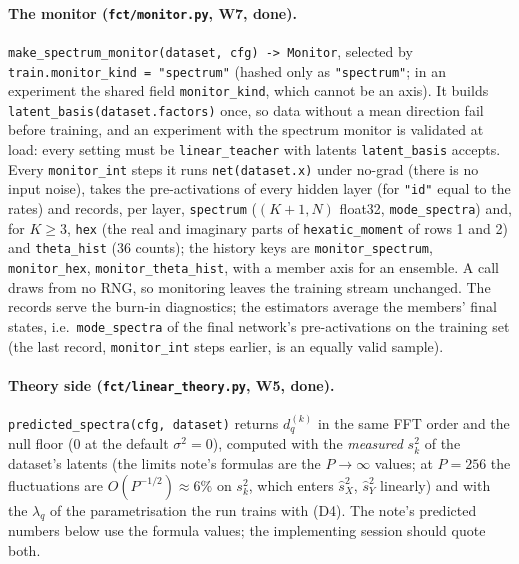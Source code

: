 \documentclass[11pt,a4paper]{article}
\newcommand{\sX}{\hat s_X^2}
\newcommand{\sY}{\hat s_Y^2}
\newcommand{\code}[1]{\texttt{#1}}
\begin{document}
\paragraph{The monitor (\code{fct/monitor.py}, W7, done).} \code{make\_spectrum\_monitor(dataset, cfg) -> Monitor}, selected by \code{train.monitor\_kind = "spectrum"} (hashed only as \code{"spectrum"}; in an experiment the shared field \code{monitor\_kind}, which cannot be an axis). It builds \code{latent\_basis(dataset.factors)} once, so data without a mean direction fail before training, and an experiment with the spectrum monitor is validated at load: every setting must be \code{linear\_teacher} with latents \code{latent\_basis} accepts. Every \code{monitor\_int} steps it runs \code{net(dataset.x)} under no-grad (there is no input noise), takes the pre-activations of every hidden layer (for \code{"id"} equal to the rates) and records, per layer, \code{spectrum} ($(K+1, N)$ float32, \code{mode\_spectra}) and, for $K\ge3$, \code{hex} (the real and imaginary parts of \code{hexatic\_moment} of rows 1 and 2) and \code{theta\_hist} (36 counts); the history keys are \code{monitor\_spectrum}, \code{monitor\_hex}, \code{monitor\_theta\_hist}, with a member axis for an ensemble. A call draws from no RNG, so monitoring leaves the training stream unchanged. The records serve the burn-in diagnostics; the estimators average the members' final states, i.e.\ \code{mode\_spectra} of the final network's pre-activations on the training set (the last record, \code{monitor\_int} steps earlier, is an equally valid sample).

\paragraph{Theory side (\code{fct/linear\_theory.py}, W5, done).} \code{predicted\_spectra(cfg, dataset)} returns $d^{(k)}_q$ in the same FFT order and the null floor ($0$ at the default $\sigma^2 = 0$), computed with the \emph{measured} $s_k^2$ of the dataset's latents (the limits note's formulas are the $P\to\infty$ values; at $P = 256$ the fluctuations are $O(P^{-1/2})\approx6\%$ on $s_k^2$, which enters $\sX$, $\sY$ linearly) and with the $\lambda_q$ of the parametrisation the run trains with (D4). The note's predicted numbers below use the formula values; the implementing session should quote both.
\end{document}
